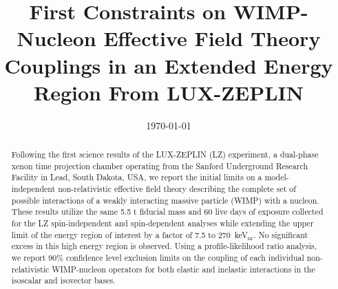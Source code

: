 \documentclass[reprint, showpacs,
preprintnumbers,
amsmath,amssymb,
aps, floatfix,
superscriptaddress,
prd, nofootinbib]{revtex4-1}
\begin{document}
\title{First Constraints on WIMP-Nucleon Effective Field Theory Couplings in an Extended Energy Region From LUX-ZEPLIN}


\date{\today}

\begin{abstract}
Following the first science results of the LUX-ZEPLIN (LZ) experiment, a dual-phase xenon time projection chamber operating from the Sanford Underground Research Facility in Lead, South Dakota, USA, we report the initial limits on a model-independent non-relativistic effective field theory describing the complete set of possible interactions of a weakly interacting massive particle (WIMP) with a nucleon. These results utilize the same 5.5 t fiducial mass and 60 live days of exposure collected for the LZ spin-independent and spin-dependent analyses while extending the upper limit of the energy region of interest by a factor of 7.5 to 270~keV$_\text{nr}$. No significant excess in this high energy region is observed. Using a profile-likelihood ratio analysis, we report 90\% confidence level exclusion limits on the coupling of each individual non-relativistic WIMP-nucleon operators for both elastic and inelastic interactions in the isoscalar and isovector bases.
\end{abstract}
    
\maketitle

\end{document}

